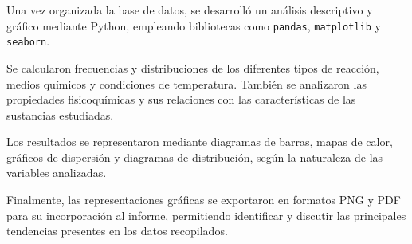 Una vez organizada la base de datos, se desarrolló un análisis descriptivo y gráfico mediante Python, empleando bibliotecas como \texttt{pandas}, \texttt{matplotlib} y \texttt{seaborn}.

Se calcularon frecuencias y distribuciones de los diferentes tipos de reacción, medios químicos y condiciones de temperatura. También se analizaron las propiedades fisicoquímicas y sus relaciones con las características de las sustancias estudiadas.

Los resultados se representaron mediante diagramas de barras, mapas de calor, gráficos de dispersión y diagramas de distribución, según la naturaleza de las variables analizadas.

Finalmente, las representaciones gráficas se exportaron en formatos PNG y PDF para su incorporación al informe, permitiendo identificar y discutir las principales tendencias presentes en los datos recopilados.

